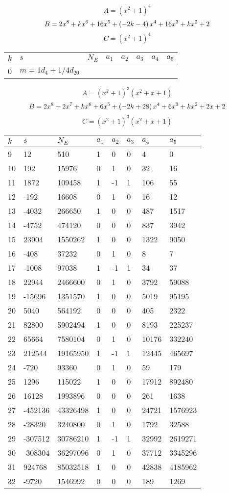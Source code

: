 \documentclass{amsart}
\begin{document}
$$A=(x^2
 + 1)^{4}$$
$$B=2\*x^8
 + k\*x^6
 + 16\*x^5
 + \left(-2\*k
 - 4\right) \*x^4
 + 16\*x^3
 + k\*x^2
 + 2$$
$$C=(x^2
 + 1)^{4}$$
\begin{longtable}{|l|l|l|lllll|}
\hline
$k$ & $s$ & $N_E$ & $a_1$ & $a_2$ & $a_3$ & $a_4$ & $a_5$\\
\hline
0&$m=1d_{4}+1/4d_{20}$&&\multicolumn{5}{c|}{}\\
\hline
\end{longtable}
$$A=(x^2
 + 1)^{3}(x^2
 + x
 + 1)$$
$$B=2\*x^8
 + 2\*x^7
 + k\*x^6
 + 6\*x^5
 + \left(-2\*k
 + 28\right) \*x^4
 + 6\*x^3
 + k\*x^2
 + 2\*x
 + 2$$
$$C=(x^2
 + 1)^{3}(x^2
 + x
 + 1)$$
\begin{longtable}{|l|l|l|lllll|}
\hline
$k$ & $s$ & $N_E$ & $a_1$ & $a_2$ & $a_3$ & $a_4$ & $a_5$\\
\hline
9&12&510&1&0&0&4&0\\
10&192&15976&0&1&0&32&16\\
11&1872&109458&1&-1&1&106&55\\
12&-192&16608&0&1&0&16&12\\
13&-4032&266650&1&0&0&487&1517\\
14&-4752&474120&0&0&0&837&3942\\
15&23904&1550262&1&0&0&1322&9050\\
16&-408&37232&0&1&0&8&7\\
17&-1008&97038&1&-1&1&34&37\\
18&22944&2466600&0&1&0&3792&59088\\
19&-15696&1351570&1&0&0&5019&95195\\
20&5040&564192&0&0&0&405&2322\\
21&82800&5902494&1&0&0&8193&225237\\
22&65664&7580104&0&1&0&10176&332240\\
23&212544&19165950&1&-1&1&12445&465697\\
24&-720&93360&0&1&0&59&179\\
25&1296&115022&1&0&0&17912&892480\\
26&16128&1993896&0&0&0&261&1638\\
27&-452136&43326498&1&0&0&24721&1576923\\
28&-28320&3240800&0&1&0&1792&32588\\
29&-307512&30786210&1&-1&1&32992&2619271\\
30&-308304&36297096&0&1&0&37712&3345296\\
31&924768&85032518&1&0&0&42838&4185962\\
32&-9720&1546992&0&0&0&189&1269\\

\end{longtable}
\end{document}

